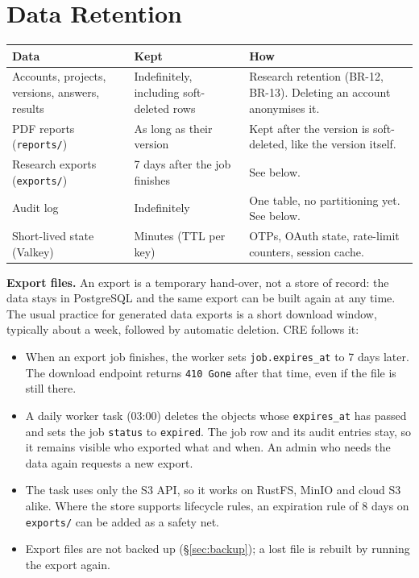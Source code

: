 \documentclass[11pt,a4paper]{article}
\newcommand{\tb}[1]{\texttt{#1}}
\begin{document}
\needspace{0.5\textheight}\section{Data Retention}\label{sec:retention}

{\small
\begin{longtable}{@{}R{3.2cm} R{4.6cm} R{8.3cm}@{}}
\toprule{}Data & Kept & How \\ \midrule\endhead
Accounts, projects, versions, answers, results & Indefinitely, including soft-deleted rows & Research retention (BR-12, BR-13). Deleting an account anonymises it. \\
PDF reports (\tb{reports/}) & As long as their version & Kept after the version is soft-deleted, like the version itself. \\
Research exports (\tb{exports/}) & 7 days after the job finishes & See below. \\
Audit log & Indefinitely & One table, no partitioning yet. See below. \\
Short-lived state (Valkey) & Minutes (TTL per key) & OTPs, OAuth state, rate-limit counters, session cache. \\
\bottomrule
\end{longtable}}

\noindent\textbf{Export files.} An export is a temporary hand-over, not a store of record: the data stays in PostgreSQL and the same export can be built again at any time. The usual practice for generated data exports is a short download window, typically about a week, followed by automatic deletion. CRE follows it:
\begin{itemize}
\item When an export job finishes, the worker sets \tb{job.expires\_at} to 7 days later. The download endpoint returns \tb{410 Gone} after that time, even if the file is still there.
\item A daily worker task (03:00) deletes the objects whose \tb{expires\_at} has passed and sets the job \tb{status} to \tb{expired}. The job row and its audit entries stay, so it remains visible who exported what and when. An admin who needs the data again requests a new export.
\item The task uses only the S3 API, so it works on RustFS, MinIO and cloud S3 alike. Where the store supports lifecycle rules, an expiration rule of 8 days on \tb{exports/} can be added as a safety net.
\item Export files are not backed up (\S\ref{sec:backup}); a lost file is rebuilt by running the export again.
\end{itemize}
\end{document}
